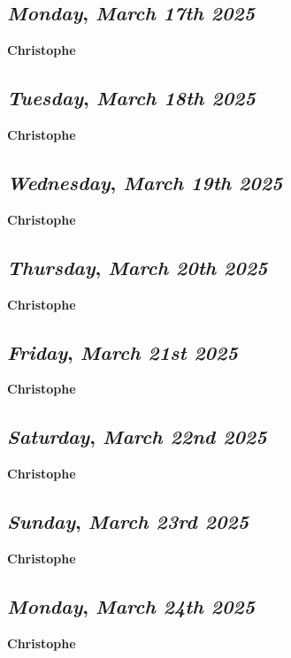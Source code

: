 \def\day{\textit{March 17th 2025}}
\def\weekday{\textit{Monday}}
\subsection*{\weekday, \day}
\textbf {Christophe}

\def\day{\textit{March 18th 2025}}
\def\weekday{\textit{Tuesday}}
\subsection*{\weekday, \day}
\textbf {Christophe}

\def\day{\textit{March 19th 2025}}
\def\weekday{\textit{Wednesday}}
\subsection*{\weekday, \day}
\textbf {Christophe}

\def\day{\textit{March 20th 2025}}
\def\weekday{\textit{Thursday}}
\subsection*{\weekday, \day}
\textbf {Christophe}

\def\day{\textit{March 21st 2025}}
\def\weekday{\textit{Friday}}
\subsection*{\weekday, \day}
\textbf {Christophe}

\def\day{\textit{March 22nd 2025}}
\def\weekday{\textit{Saturday}}
\subsection*{\weekday, \day}
\textbf {Christophe}

\def\day{\textit{March 23rd 2025}}
\def\weekday{\textit{Sunday}}
\subsection*{\weekday, \day}
\textbf {Christophe}

\def\day{\textit{March 24th 2025}}
\def\weekday{\textit{Monday}}
\subsection*{\weekday, \day}
\textbf {Christophe}

\def\day{\textit{March 25th 2025}}
\def\weekday{\textit{Tuesday}}
